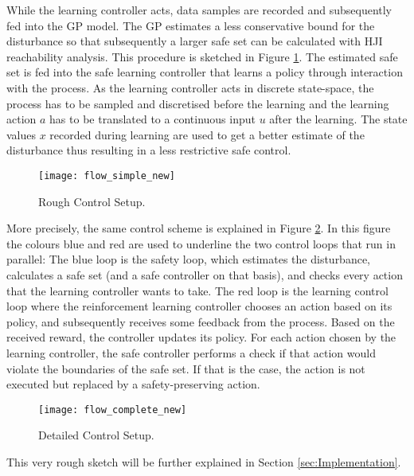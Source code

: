 \documentclass[../main.tex]{subfiles}
\begin{document}
While the learning controller acts, data samples are recorded and subsequently fed into the GP model. The GP estimates a less conservative bound for the disturbance so that subsequently a larger safe set can be calculated with HJI reachability analysis. This procedure is sketched in Figure \ref{fig:flow_simple}. The estimated safe set is fed into the safe learning controller that learns a policy through interaction with the process. As the learning controller acts in discrete state-space, the process has to be sampled and discretised before the learning and the learning action $a$ has to be translated to a continuous input $u$ after the learning. The state values $x$ recorded during learning are used to get a better estimate of the disturbance thus resulting in a less restrictive safe control.\par
\begin{figure}
    \centering
    \texttt{[image: flow\_simple\_new]}
    \caption{Rough Control Setup.}
    \label{fig:flow_simple}
\end{figure}
More precisely, the same control scheme is explained in Figure \ref{fig:flow_complete}. In this figure the colours blue and red are used to underline the two control loops that run in parallel: The blue loop is the safety loop, which estimates the disturbance, calculates a safe set (and a safe controller on that basis), and checks every action that the learning controller wants to take. The red loop is the learning control loop where the reinforcement learning controller chooses an action based on its policy, and subsequently receives some feedback from the process. Based on the received reward, the controller updates its policy. For each action chosen by the learning controller, the safe controller performs a check if that action would violate the boundaries of the safe set. If that is the case, the action is not executed but replaced by a safety-preserving action.
\begin{figure}
    \centering
    \texttt{[image: flow\_complete\_new]}
    \caption{Detailed Control Setup.}
    \label{fig:flow_complete}
\end{figure}
This very rough sketch will be further explained in Section \ref{sec:Implementation}.
\end{document}
